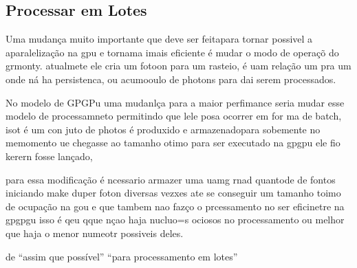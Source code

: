   \subsection{Processar em Lotes}
    Uma mudança muito importante que deve ser feitapara tornar possivel a aparalelização na gpu e tornama imais eficiente é  mudar o modo de operaçõ do grmonty. atualmete ele cria um fotoon para um rasteio, é uam relação um pra um onde ná ha persistenca, ou acumooulo de photons para dai serem processados.

    No modelo  de GPGPu uma mudanlça para a maior perfimance seria mudar esse modelo de processamneto permitindo que lele posa ocorrer em for ma de batch, isot é um con juto de photos é produxido e armazenadopara sobemente no memomento ue chegasse ao tamanho otimo para ser executado na gpgpu ele fio kerern fosse lançado,

    para essa modificação é ncessario armazer uma uamg rnad quantode de fontos iniciando  make duper foton diversas vezxes ate se conseguir um tamanho toimo de ocupação na gou e que tambem nao fazço o prcessamento no ser eficinetre na gpgpgu isso é qeu qque nçao haja nucluo=s ociosos no processamento ou melhor que haja o menor numeotr possiveis deles.

    de ``assim que possível'' ``para processamento em lotes''
